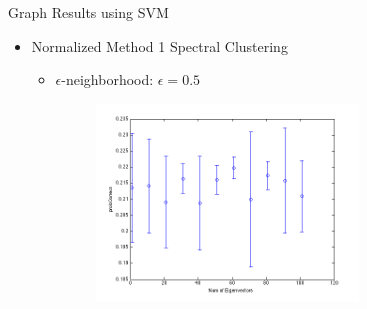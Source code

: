 \documentclass[xcolor=dvipsnames,t]{beamer} %
\begin{document}
\begin{frame}{Graph Results using SVM}
\begin{itemize}
\item Normalized Method 1 Spectral Clustering 
\begin{itemize}
\item $\epsilon$-neighborhood: $\epsilon = 0.5$
\begin{figure}[h!]
\centering
  \centering
    \includegraphics[width=0.7\textwidth]{figures/plotopt1n1.png}
\end{figure}
\end{itemize}
\end{itemize}

\end{frame}
\end{document}
